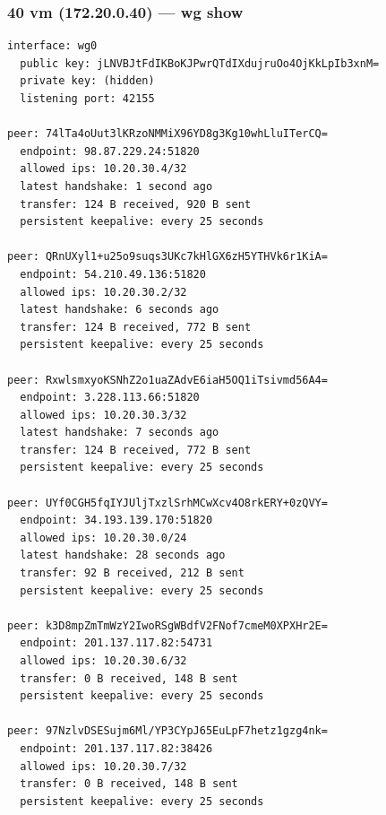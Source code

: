 \documentclass[11pt,a4paper]{article}
\begin{document}
\subsubsection*{40 vm (172.20.0.40) — wg show}
\begin{lstlisting}
interface: wg0
  public key: jLNVBJtFdIKBoKJPwrQTdIXdujruOo4OjKkLpIb3xnM=
  private key: (hidden)
  listening port: 42155

peer: 74lTa4oUut3lKRzoNMMiX96YD8g3Kg10whLluITerCQ=
  endpoint: 98.87.229.24:51820
  allowed ips: 10.20.30.4/32
  latest handshake: 1 second ago
  transfer: 124 B received, 920 B sent
  persistent keepalive: every 25 seconds

peer: QRnUXyl1+u25o9suqs3UKc7kHlGX6zH5YTHVk6r1KiA=
  endpoint: 54.210.49.136:51820
  allowed ips: 10.20.30.2/32
  latest handshake: 6 seconds ago
  transfer: 124 B received, 772 B sent
  persistent keepalive: every 25 seconds

peer: RxwlsmxyoKSNhZ2o1uaZAdvE6iaH5OQ1iTsivmd56A4=
  endpoint: 3.228.113.66:51820
  allowed ips: 10.20.30.3/32
  latest handshake: 7 seconds ago
  transfer: 124 B received, 772 B sent
  persistent keepalive: every 25 seconds

peer: UYf0CGH5fqIYJUljTxzlSrhMCwXcv4O8rkERY+0zQVY=
  endpoint: 34.193.139.170:51820
  allowed ips: 10.20.30.0/24
  latest handshake: 28 seconds ago
  transfer: 92 B received, 212 B sent
  persistent keepalive: every 25 seconds

peer: k3D8mpZmTmWzY2IwoRSgWBdfV2FNof7cmeM0XPXHr2E=
  endpoint: 201.137.117.82:54731
  allowed ips: 10.20.30.6/32
  transfer: 0 B received, 148 B sent
  persistent keepalive: every 25 seconds

peer: 97NzlvDSESujm6Ml/YP3CYpJ65EuLpF7hetz1gzg4nk=
  endpoint: 201.137.117.82:38426
  allowed ips: 10.20.30.7/32
  transfer: 0 B received, 148 B sent
  persistent keepalive: every 25 seconds

\end{lstlisting}
\end{document}
